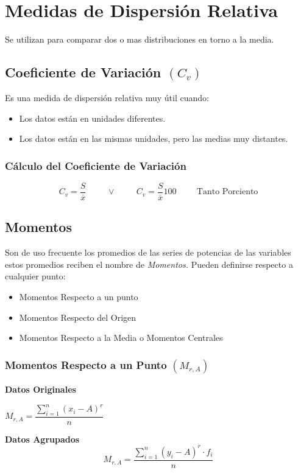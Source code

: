 \section{Medidas de Dispersión Relativa}
Se utilizan para comparar dos o mas distribuciones en torno a la media.
\subsection{Coeficiente de Variación $(C_v)$}
Es una medida de dispersión relativa muy útil cuando:
\begin{itemize}
\item Los datos están en unidades diferentes.
\item Los datos están en las mismas unidades, pero las medias muy distantes.
\end{itemize}
\subsubsection{Cálculo del Coeficiente de Variación}
$$C_v=\dfrac{S}{\overline{x}} \hspace{1cm}\vee\hspace{1cm}  C_v=\dfrac{S}{\overline{x}}100\hspace{1cm}\textrm{Tanto Porciento} $$
\subsection{Momentos}
Son de uso frecuente los promedios de las series de potencias de las variables estos promedios reciben el nombre de \textit{Momentos.} Pueden definirse respecto a cualquier punto:
\begin{itemize}
\item Momentos Respecto a un punto
\item Momentos Respecto del Origen
\item Momentos Respecto a la Media o Momentos Centrales
\end{itemize}
\subsubsection{Momentos Respecto a un Punto $(M_{r,A})$}
\begin{multicols}{2}
\textbf{Datos Originales} 
\begin{center}
$M_{r,A}=\dfrac{\displaystyle\sum_{i=1}^{n}(x_i-A)^r}{n}$
\end{center}
\columnbreak
\textbf{Datos Agrupados}
$$M_{r,A}=\dfrac{\displaystyle\sum_{i=1}^{n}(y_i-A)^r\cdot f_i}{n}$$
\end{multicols}
